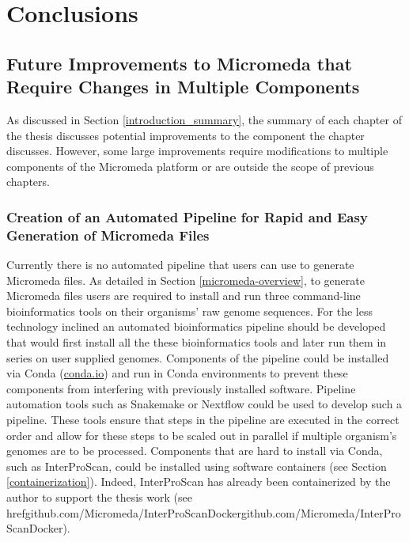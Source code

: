 \chapter{Conclusions} \label{conclusion-chapter}


\section{Future Improvements to Micromeda that Require Changes in Multiple Components}

As discussed in Section \ref{introduction_summary}, the summary of each chapter of the thesis discusses potential improvements to the component the chapter discusses. However, some large improvements require modifications to multiple components of the Micromeda platform or are outside the scope of previous chapters.

\subsection{Creation of an Automated Pipeline for Rapid and Easy Generation of Micromeda Files}

Currently there is no automated pipeline that users can use to generate Micromeda files. As detailed in Section \ref{micromeda-overview}, to generate Micromeda files users are required to install and run three command-line bioinformatics tools on their organisms' raw genome sequences. For the less technology inclined an automated bioinformatics pipeline should be developed that would first install all the these bioinformatics tools and later run them in series on user supplied genomes. Components of the pipeline could be installed via Conda (\href{conda.io}{conda.io}) and run in Conda environments to prevent these components from interfering with previously installed software. Pipeline automation tools such as Snakemake \cite{koster2012snakemake} or Nextflow \cite{di2017nextflow} could be used to develop such a pipeline. These tools ensure that steps in the pipeline are executed in the correct order and allow for these steps to be scaled out in parallel if multiple organism's genomes are to be processed. Components that are hard to install via Conda, such as InterProScan, could be installed using software containers (see Section \ref{containerization}). Indeed, InterProScan has already been containerized by the author to support the thesis work (see href{github.com/Micromeda/InterProScan\-Docker}{github.com/Micromeda/InterProScan\-Docker}).

